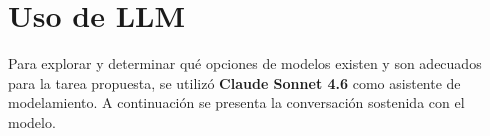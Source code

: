 \documentclass[12pt, letterpaper]{article}
\begin{document}
\section{Uso de LLM}

Para explorar y determinar qué opciones de modelos existen y son adecuados para la tarea propuesta,
se utilizó \textbf{Claude Sonnet 4.6} como asistente de modelamiento. A continuación se presenta la
conversación sostenida con el modelo.

\bigskip




\newenvironment{usermsg}{%
  \begin{tcolorbox}[
    enhanced,
    colback=userbg,
    colframe=userborder,
    arc=8pt,
    boxrule=0.4pt,
    left=10pt, right=10pt, top=7pt, bottom=7pt,
    fontupper=\small,
    before upper={\textcolor{labeluser}{\textbf{\small Usuario}}\par\smallskip},
    before={\smallskip},
    after={\smallskip}
  ]
}{%
  \end{tcolorbox}
}

\newenvironment{aimsg}{%
  \begin{tcolorbox}[
    enhanced,
    colback=aibg,
    colframe=aiborder,
    arc=8pt,
    boxrule=0.4pt,
    left=10pt, right=10pt, top=7pt, bottom=7pt,
    fontupper=\small,
    before upper={\textcolor{labelai}{\textbf{\small Claude Sonnet 4.6}}\par\smallskip},
    before={\begin{flushleft}\begin{minipage}{0.88\linewidth}},
    after={\end{minipage}\end{flushleft}\smallskip}
  ]
}{%
  \end{tcolorbox}
}
\end{document}
